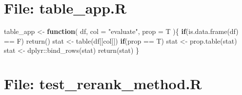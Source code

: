 \documentclass[
]{article}
\newenvironment{Shaded}{\begin{snugshade}}{\end{snugshade}}
\newcommand{\AttributeTok}[1]{\textcolor[rgb]{0.77,0.63,0.00}{#1}}
\newcommand{\ControlFlowTok}[1]{\textcolor[rgb]{0.13,0.29,0.53}{\textbf{#1}}}
\newcommand{\FunctionTok}[1]{\textcolor[rgb]{0.00,0.00,0.00}{#1}}
\newcommand{\NormalTok}[1]{#1}
\newcommand{\OtherTok}[1]{\textcolor[rgb]{0.56,0.35,0.01}{#1}}
\newcommand{\SpecialCharTok}[1]{\textcolor[rgb]{0.00,0.00,0.00}{#1}}
\newcommand{\StringTok}[1]{\textcolor[rgb]{0.31,0.60,0.02}{#1}}
\begin{document}
\hypertarget{file-table_app.r}{%
\section{File: table\_app.R}\label{file-table_app.r}}

\begin{Shaded}
\begin{Highlighting}[]
\NormalTok{table\_app }\OtherTok{\textless{}{-}} 
  \ControlFlowTok{function}\NormalTok{(}
\NormalTok{           df,}
           \AttributeTok{col =} \StringTok{"evaluate"}\NormalTok{,}
           \AttributeTok{prop =}\NormalTok{ T}
\NormalTok{           )\{}
    \ControlFlowTok{if}\NormalTok{(}\FunctionTok{is.data.frame}\NormalTok{(df) }\SpecialCharTok{==}\NormalTok{ F)}
      \FunctionTok{return}\NormalTok{()}
\NormalTok{    stat }\OtherTok{\textless{}{-}} \FunctionTok{table}\NormalTok{(df[[col]])}
    \ControlFlowTok{if}\NormalTok{(prop }\SpecialCharTok{==}\NormalTok{ T)}
\NormalTok{      stat }\OtherTok{\textless{}{-}} \FunctionTok{prop.table}\NormalTok{(stat)}
\NormalTok{    stat }\OtherTok{\textless{}{-}}\NormalTok{ dplyr}\SpecialCharTok{::}\FunctionTok{bind\_rows}\NormalTok{(stat)}
    \FunctionTok{return}\NormalTok{(stat)}
\NormalTok{  \}}
\end{Highlighting}
\end{Shaded}

\hypertarget{file-test_rerank_method.r}{%
\section{File: test\_rerank\_method.R}\label{file-test_rerank_method.r}}
\end{document}
